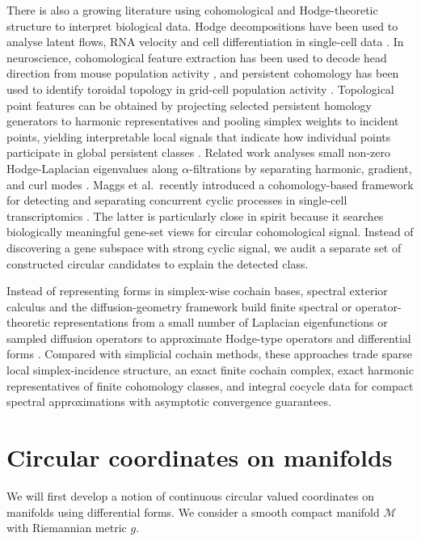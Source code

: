 \documentclass[a4paper,11pt, DIV=10]{scrartcl}
\numberwithin{equation}{section}
\theoremstyle{definition}
\theoremstyle{remark}
\newcommand{\mc}[1]{\mathcal{#1}}
\begin{document}
There is also a growing literature using cohomological and Hodge-theoretic structure to interpret biological data.
Hodge decompositions have been used to analyse latent flows, RNA velocity and cell differentiation in single-cell data \cite{maehara2019modeling,su2024hodge,cheng2024phlower}.
In neuroscience, cohomological feature extraction has been used to decode head direction from mouse population activity \cite{rybakken2019decoding}, and persistent cohomology has been used to identify toroidal topology in grid-cell population activity \cite{gardner2022toroidal}.
Topological point features can be obtained by projecting selected persistent homology generators to harmonic representatives and pooling simplex weights to incident points, yielding interpretable local signals that indicate how individual points participate in global persistent classes \cite{grande2025point}.
Related work analyses small non-zero Hodge-Laplacian eigenvalues along $\alpha$-filtrations by separating harmonic, gradient, and curl modes \cite{grandeNotAllSmallEigenvalues}.
Maggs et al.\ recently introduced a cohomology-based framework for detecting and separating concurrent cyclic processes in single-cell transcriptomics \cite{Maggs2025TopologyConcurrentCyclicProcesses}.
The latter is particularly close in spirit because it searches biologically meaningful gene-set views for circular cohomological signal.
 Instead of discovering a gene subspace with strong cyclic signal, we audit a separate set of constructed circular candidates to explain the detected class.

Instead of representing forms in simplex-wise cochain bases, spectral exterior calculus and the diffusion-geometry framework build finite spectral or operator-theoretic representations from a small number of Laplacian eigenfunctions or sampled diffusion operators to approximate Hodge-type operators and differential forms \cite{berry2020spectral,jones2024diffusion,jones2024manifold}.
Compared with simplicial cochain methods, these approaches trade sparse local simplex-incidence structure, an exact finite cochain complex, exact harmonic representatives of finite cohomology classes, and integral cocycle data for compact spectral approximations with asymptotic convergence guarantees.

	\section{Circular coordinates on manifolds}
	\label{sec:circular-coordinates-manifolds}
	We will first develop a notion of continuous circular valued coordinates on manifolds using differential forms.
	We consider a smooth compact manifold $\mc{M}$ with Riemannian metric $g$.
\end{document}
